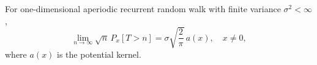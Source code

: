 For one-dimensional aperiodic recurrent random walk with finite variance $\sigma^2 < \infty$,
$$\lim_{n \to \infty} \sqrt{n} \, P_x[T > n] = \sigma \sqrt{\frac{2}{\pi}} \, a(x), \quad x \neq 0,$$
where $a(x)$ is the potential kernel.
